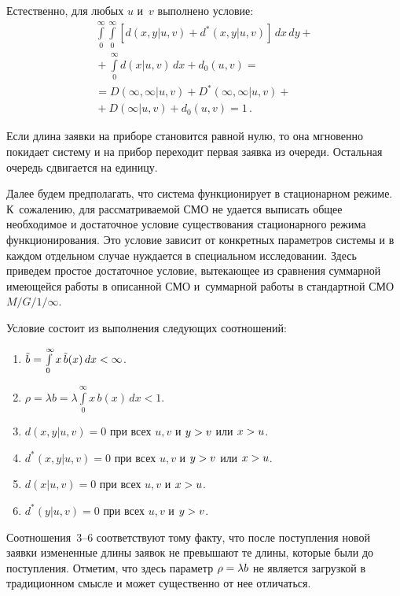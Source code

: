 \begin{multicols}{2}
Естественно, для любых $u$ и~$v$ выполнено условие:
\begin{multline}
\label{(2.1)}
\int\limits_0^\infty
\int\limits_0^\infty
[d(x,y|u,v) + d^*(x,y|u,v)]
\,dx\,dy
+ {}\\
{}+\int\limits_0^\infty d(x|u,v) \,dx + d_0(u,v) = {}\\
{}= D(\infty,\infty|u,v)+D^*(\infty,\infty|u,v)
+{}\\
 {}+D(\infty|u,v) + d_0(u,v) = 1\,.
\end{multline}



Если длина заявки на приборе становится
равной нулю, то она мгновенно покидает
систему и на прибор переходит первая
заявка из очереди.
Остальная очередь сдвигается на единицу.


Далее будем предполагать, что система
функционирует в стационарном режиме.
К~сожалению, для рассматриваемой СМО не
удается выписать общее необходимое и
достаточное условие существования стационарного
режима функционирования.
Это условие зависит от конкретных параметров
сис\-те\-мы и в каждом отдельном случае нуждается
в специальном исследовании.
Здесь приведем прос\-тое достаточ\-ное условие,
вытекающее из сравнения суммарной имеющейся
работы в описанной СМО и~суммарной работы в
стандартной СМО $M/G/1/\infty$.

Условие состоит из выполнения следующих
соотношений:
\begin{enumerate}[1.]
\item  $\tilde b =
\int\limits_0^\infty x\,\tilde b(x)\,dx < \infty$.

\item $\rho = \lambda b =
\lambda \int\limits_0^\infty x\, b(x)\,dx < 1$.

\item $d(x,y|u,v) = 0$ при всех $u,v$ и
$y\hm>v$ или $x\hm>u$.

\item $d^*(x,y|u,v) = 0$ при всех $u,v$ и
$y\hm>v$ или $x\hm>u$.

\item $d(x|u,v) = 0$ при всех $u,v$ и
$x\hm>u$.

\item $d^*(y|u,v) = 0$ при всех $u,v$ и
$y\hm>v$.
\end{enumerate}

Соотношения~{3}--{6} соответствуют
тому факту, что после поступления новой заявки
измененные длины заявок не превышают те длины,
которые были до поступления.
Отметим, что здесь параметр $\rho \hm= \lambda b$ не
является загрузкой в традиционном смысле и может
существенно от нее отличаться.


\end{multicols}
